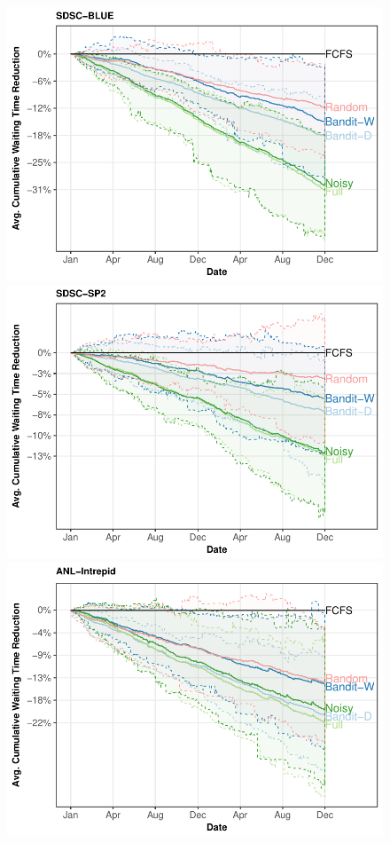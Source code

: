 \documentclass[sigconf,anonymous]{acmart}
\begin{document}
\begin{figure}[]
  \includegraphics[scale=0.6]{figures/SDSC-BLU.pdf}\\
  \includegraphics[scale=0.6]{figures/SDSC-SP2.pdf}
  \includegraphics[scale=0.6]{figures/ANL-Intr.pdf}


\end{figure}
\end{document}
